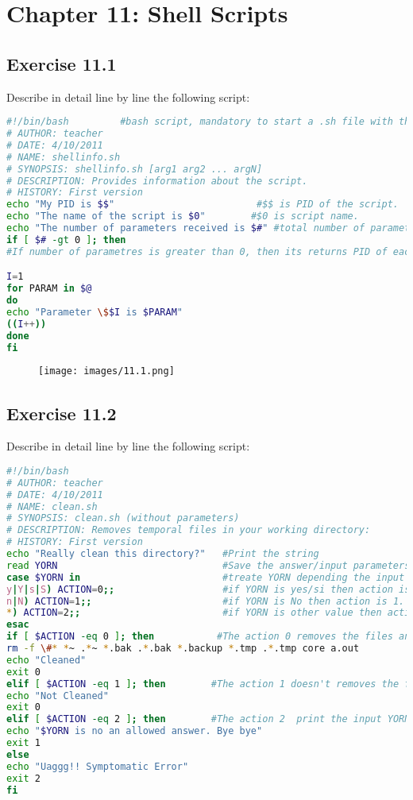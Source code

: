 \documentclass[12pt, titlepage,]{article}
\begin{document}
\section{Chapter 11: Shell Scripts}
\subsection{Exercise 11.1}
Describe in detail line by line the following script:
\begin{lstlisting}[language=Bash]
#!/bin/bash         #bash script, mandatory to start a .sh file with this command.
# AUTHOR: teacher   
# DATE: 4/10/2011
# NAME: shellinfo.sh    
# SYNOPSIS: shellinfo.sh [arg1 arg2 ... argN]  
# DESCRIPTION: Provides information about the script.
# HISTORY: First version
echo "My PID is $$"                         #$$ is PID of the script.
echo "The name of the script is $0"        #$0 is script name.
echo "The number of parameters received is $#" #total number of parameters received.
if [ $# -gt 0 ]; then   
#If number of parametres is greater than 0, then its returns PID of each parameters.

I=1
for PARAM in $@
do
echo "Parameter \$$I is $PARAM"
((I++))
done
fi
\end{lstlisting}

\begin{figure}[h] %
\centering
{\texttt{[image: images/11.1.png]}}
\end{figure} 

\subsection{Exercise 11.2}
Describe in detail line by line the following script:
\begin{lstlisting}[language=Bash]
#!/bin/bash
# AUTHOR: teacher
# DATE: 4/10/2011
# NAME: clean.sh
# SYNOPSIS: clean.sh (without parameters)
# DESCRIPTION: Removes temporal files in your working directory:
# HISTORY: First version
echo "Really clean this directory?"   #Print the string
read YORN                             #Save the answer/input parameters as YORN
case $YORN in                         #treate YORN depending the input
y|Y|s|S) ACTION=0;;                   #if YORN is yes/si then action is 0.
n|N) ACTION=1;;                       #if YORN is No then action is 1.
*) ACTION=2;;                         #if YORN is other value then action is 2.
esac
if [ $ACTION -eq 0 ]; then           #The action 0 removes the files and print Cleaned.
rm -f \#* *~ .*~ *.bak .*.bak *.backup *.tmp .*.tmp core a.out
echo "Cleaned"
exit 0
elif [ $ACTION -eq 1 ]; then        #The action 1 doesn't removes the files and print Not Cleaned.
echo "Not Cleaned"
exit 0
elif [ $ACTION -eq 2 ]; then        #The action 2  print the input YORN isn't allowd answer.Bye bye.
echo "$YORN is no an allowed answer. Bye bye"
exit 1
else
echo "Uaggg!! Symptomatic Error"
exit 2
fi
\end{lstlisting}
\end{document}
